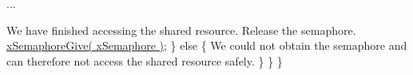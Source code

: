 \begin{DoxyPre}...\end{DoxyPre}



\begin{DoxyPre}We have finished accessing the shared resource.  Release the
semaphore.
            \hyperlink{semphr_8h_aae55761cabfa9bf85c8f4430f78c0953}{xSemaphoreGive( xSemaphore )};
        \}
        else
        \{
We could not obtain the semaphore and can therefore not access
the shared resource safely.
        \}
    \}
 \}
 \end{DoxyPre}
 